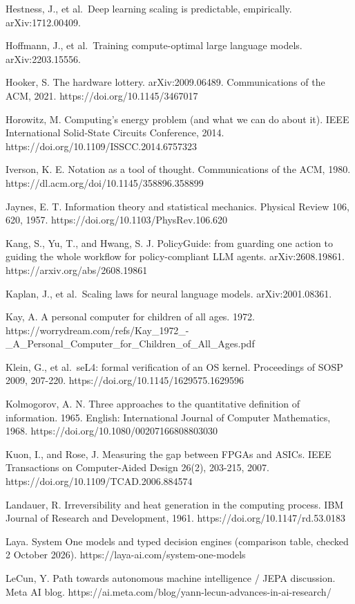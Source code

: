 \documentclass[
  10pt,
]{article}
\begin{document}
Hestness, J., et al.~Deep learning scaling is predictable, empirically.
arXiv:1712.00409.

Hoffmann, J., et al.~Training compute-optimal large language models.
arXiv:2203.15556.

Hooker, S. The hardware lottery. arXiv:2009.06489. Communications of the
ACM, 2021. https://doi.org/10.1145/3467017

Horowitz, M. Computing's energy problem (and what we can do about it).
IEEE International Solid-State Circuits Conference, 2014.
https://doi.org/10.1109/ISSCC.2014.6757323

Iverson, K. E. Notation as a tool of thought. Communications of the ACM,
1980. https://dl.acm.org/doi/10.1145/358896.358899

Jaynes, E. T. Information theory and statistical mechanics. Physical
Review 106, 620, 1957. https://doi.org/10.1103/PhysRev.106.620

Kang, S., Yu, T., and Hwang, S. J. PolicyGuide: from guarding one action
to guiding the whole workflow for policy-compliant LLM agents.
arXiv:2608.19861. https://arxiv.org/abs/2608.19861

Kaplan, J., et al.~Scaling laws for neural language models.
arXiv:2001.08361.

Kay, A. A personal computer for children of all ages. 1972.
https://worrydream.com/refs/Kay\_1972\_-\_A\_Personal\_Computer\_for\_Children\_of\_All\_Ages.pdf

Klein, G., et al.~seL4: formal verification of an OS kernel. Proceedings
of SOSP 2009, 207-220. https://doi.org/10.1145/1629575.1629596

Kolmogorov, A. N. Three approaches to the quantitative definition of
information. 1965. English: International Journal of Computer
Mathematics, 1968. https://doi.org/10.1080/00207166808803030

Kuon, I., and Rose, J. Measuring the gap between FPGAs and ASICs. IEEE
Transactions on Computer-Aided Design 26(2), 203-215, 2007.
https://doi.org/10.1109/TCAD.2006.884574

Landauer, R. Irreversibility and heat generation in the computing
process. IBM Journal of Research and Development, 1961.
https://doi.org/10.1147/rd.53.0183

Laya. System One models and typed decision engines (comparison table,
checked 2 October 2026). https://laya-ai.com/system-one-models

LeCun, Y. Path towards autonomous machine intelligence / JEPA
discussion. Meta AI blog.
https://ai.meta.com/blog/yann-lecun-advances-in-ai-research/
\end{document}
